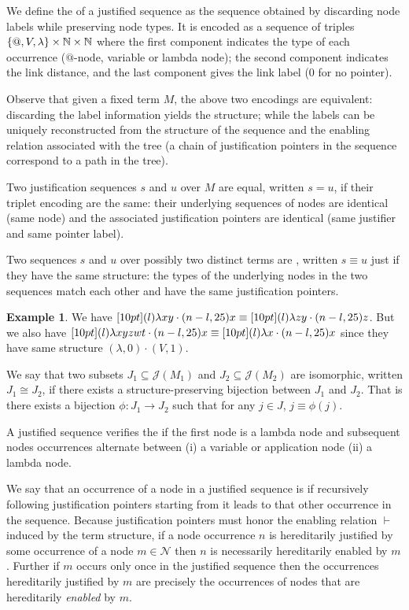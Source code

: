 \documentclass{article}
\theoremstyle{definition}
\newtheorem{example}{Example}[section]
\newcommand\Nodes{\mathcal{N}}%
\newcommand{\enables}{\vdash} %
\def\justseqset{\mathcal{J}}
\begin{document}
We define the  of a justified sequence as the sequence obtained by discarding node labels while preserving node types. It is encoded as a sequence of triples $\{@, V, \lambda \}\times\mathbb{N}\times\mathbb{N}$ where the first component indicates the type of each occurrence ($@$-node, variable or lambda node); the second component indicates the link distance, and the last component gives the link label ($0$ for no pointer).

Observe that given a fixed term $M$, the above two encodings are equivalent: discarding the label information yields the structure; while the labels can be uniquely reconstructed from the structure of the sequence and the enabling relation associated with the tree (a chain of justification pointers in the sequence correspond to a path in the tree).

Two justification sequences $s$ and $u$ over $M$ are equal, written $s=u$, if their triplet encoding are the same: their underlying sequences of nodes are identical (same node) and the associated justification pointers are identical (same justifier and same pointer label).

Two sequences $s$ and $u$ over possibly two distinct terms are , written $s \equiv u$ just if they have the same structure: the types of the underlying nodes in the two sequences match each other and have the same justification pointers.

\begin{example}
We have $\Pstr[10pt]{ (l){\lambda x y} \cdot (n-l,25){x} } \equiv \Pstr[10pt]{ (l){\lambda z y} \cdot (n-l,25){z}}$. But we also have $\Pstr[10pt]{ (l){\lambda x y z w t} \cdot (n-l,25){x} } \equiv \Pstr[10pt]{ (l){\lambda x} \cdot (n-l,25){x}}$ since they have same structure $(\lambda,0)\cdot(V,1)$.
\end{example}

We say that two subsets $J_1\subseteq \justseqset(M_1)$ and $J_2\subseteq\justseqset(M_2)$ are isomorphic, written $J_1\cong J_2$, if  there exists a structure-preserving bijection between $J_1$ and $J_2$. That is there exists a bijection $\phi :J_1\longrightarrow J_2$ such that for any $j\in J$, $j\equiv\phi(j)$.

A justified sequence verifies the  if the first node is a lambda node and subsequent nodes occurrences alternate between (i) a variable or application node (ii) a lambda node.

We say that an occurrence of a node in a justified sequence is  if recursively following justification pointers starting from it leads to that other occurrence in the sequence. Because justification pointers must honor the enabling relation $\enables$ induced by the term structure, if a node occurrence $n$ is hereditarily justified by some occurrence of a node $m\in\Nodes$ then $n$ is necessarily hereditarily enabled by $m$. Further if $m$ occurs only once in the justified sequence then the occurrences hereditarily justified by $m$ are precisely the occurrences of nodes that are hereditarily \emph{enabled} by $m$.
\end{document}
